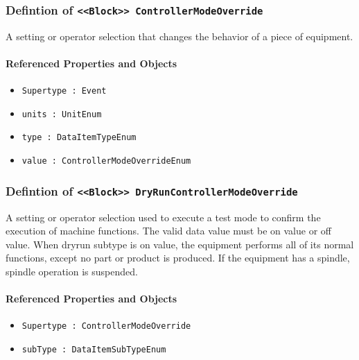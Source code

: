 \subsubsection{Defintion of \texttt{<<Block>> ControllerModeOverride}}
  \label{type:ControllerModeOverride}

\FloatBarrier

A setting or operator selection that changes the behavior of a piece of equipment.

\FloatBarrier
\paragraph{Referenced Properties and Objects}

\begin{itemize}
\item \texttt{Supertype : Event}

\item \texttt{units : UnitEnum}

\item \texttt{type : DataItemTypeEnum}

\item \texttt{value : ControllerModeOverrideEnum}

\end{itemize}
\FloatBarrier
\subsubsection{Defintion of \texttt{<<Block>> DryRunControllerModeOverride}}
  \label{type:DryRunControllerModeOverride}

\FloatBarrier

A setting or operator selection used to execute a test mode to confirm the execution of machine functions. 
 The valid data value must be on value or off value. 
 When dryrun subtype is on value, the equipment performs all of its normal functions, except no part or product is produced.  If the equipment has a spindle, spindle operation is suspended.

\FloatBarrier
\paragraph{Referenced Properties and Objects}

\begin{itemize}
\item \texttt{Supertype : ControllerModeOverride}

\item \texttt{subType : DataItemSubTypeEnum}

\end{itemize}
\FloatBarrier
